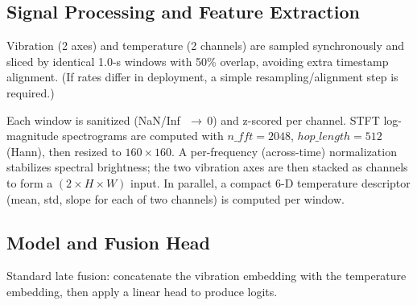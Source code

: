 \documentclass[pdflatex,sn-mathphys-num]{sn-jnl}%
\begin{document}
\subsection{Signal Processing and Feature Extraction}
Vibration (2 axes) and temperature (2 channels) are sampled synchronously and sliced by identical 1.0-s windows with 50\% overlap, avoiding extra timestamp alignment. (If rates differ in deployment, a simple resampling/alignment step is required.)

Each window is sanitized (NaN/Inf \,\,$\to$\,0) and z-scored per channel. STFT log-magnitude spectrograms are computed with $n\_{fft}=2048$, $hop\_length=512$ (Hann), then resized to $160\times160$. A per-frequency (across-time) normalization stabilizes spectral brightness; the two vibration axes are then stacked as channels to form a $(2\times H\times W)$ input. In parallel, a compact 6-D temperature descriptor (mean, std, slope for each of two channels) is computed per window.

\subsection{Model and Fusion Head}
Standard late fusion: concatenate the vibration embedding with the temperature embedding, then apply a linear head to produce logits.
\end{document}
